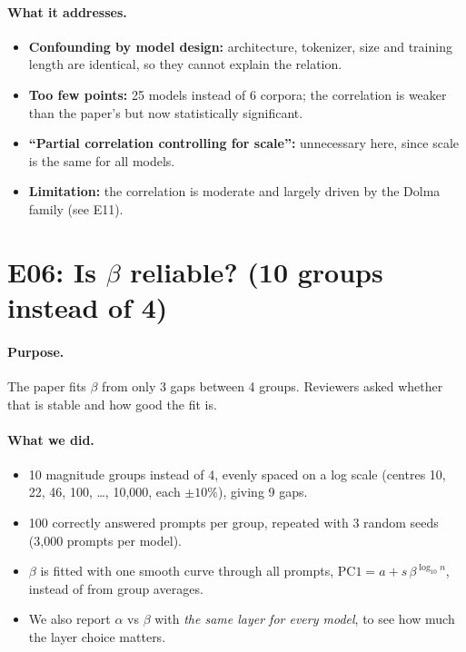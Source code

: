\documentclass[11pt]{article}
\begin{document}
\paragraph{What it addresses.}
\begin{itemize}
\item \textbf{Confounding by model design:} architecture, tokenizer, size and training length are
  identical, so they cannot explain the relation.
\item \textbf{Too few points:} 25 models instead of 6 corpora; the correlation is weaker than the
  paper's but now statistically significant.
\item \textbf{``Partial correlation controlling for scale'':} unnecessary here, since scale is the same
  for all models.
\item \textbf{Limitation:} the correlation is moderate and largely driven by the Dolma family (see
  E11).
\end{itemize}

\section{E06: Is $\beta$ reliable? (10 groups instead of 4)}

\paragraph{Purpose.} The paper fits $\beta$ from only 3 gaps between 4 groups. Reviewers asked whether
that is stable and how good the fit is.

\paragraph{What we did.}
\begin{itemize}
\item 10 magnitude groups instead of 4, evenly spaced on a log scale (centres 10, 22, 46, 100, \dots,
  10{,}000, each $\pm10\%$), giving 9 gaps.
\item 100 correctly answered prompts per group, repeated with 3 random seeds (3{,}000 prompts per
  model).
\item $\beta$ is fitted with one smooth curve through all prompts, $\text{PC1} = a + s\,\beta^{\log_{10} n}$,
  instead of from group averages.
\item We also report $\alpha$ vs $\beta$ with \emph{the same layer for every model}, to see how much the
  layer choice matters.
\end{itemize}
\end{document}
